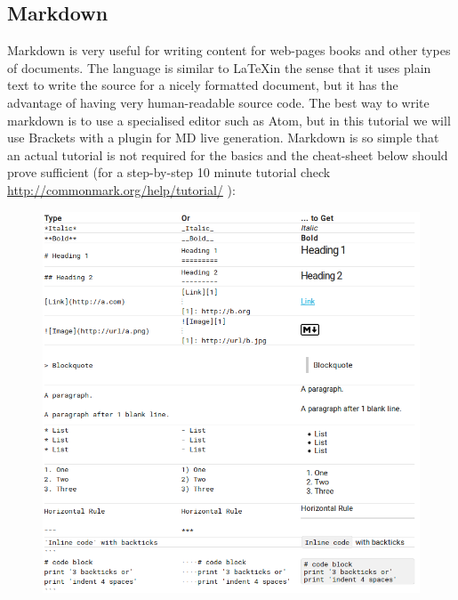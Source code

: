 \documentclass[11pt,a4paper,final]{article}
\begin{document}
\subsection{Markdown}
Markdown is very useful for writing content for web-pages books and other types of documents. The language is similar to \LaTeX in the sense that it uses plain text to write the source for a nicely formatted document, but it has the advantage of having very human-readable source code. The best way to write markdown is to use a specialised editor such as Atom, but in this tutorial we will use Brackets with a plugin for MD live generation. Markdown is so simple that an actual tutorial is not required for the basics and the cheat-sheet below should prove sufficient (for a step-by-step 10 minute tutorial check \url{http://commonmark.org/help/tutorial/} ):
\begin{figure}[!HT]
\centering
\includegraphics[scale=0.6]{MD-Tutorial.png}
\end{figure}
\end{document}

